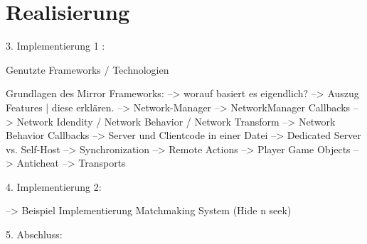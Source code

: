 \chapter{Realisierung}
\label{sec:realisierung}

3. Implementierung 1 :

Genutzte Frameworks / Technologien

Grundlagen des Mirror Frameworks:
--> worauf basiert es eigendlich? 
--> Auszug Features | diese erklären.
--> Network-Manager
--> NetworkManager Callbacks
--> Network Idendity / Network Behavior / Network Transform
--> Network Behavior Callbacks
--> Server und Clientcode in einer Datei
--> Dedicated Server vs. Self-Host
--> Synchronization
--> Remote Actions
--> Player Game Objects
--> Anticheat
--> Transports

4. Implementierung 2:


--> Beispiel Implementierung Matchmaking System (Hide n seek)


5. Abschluss:



